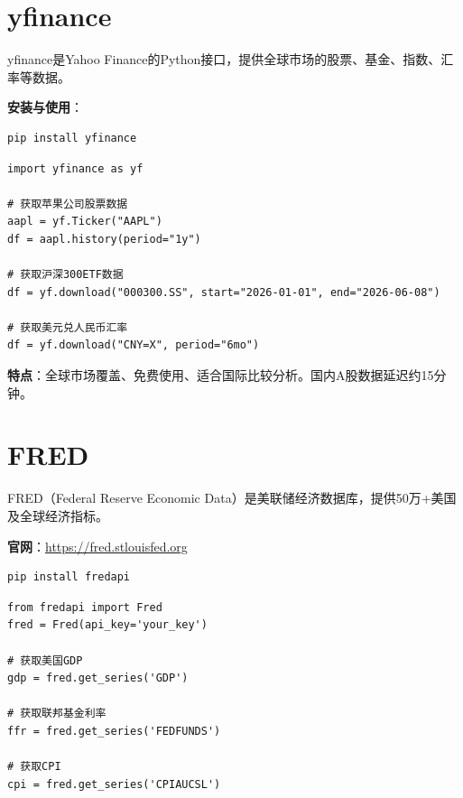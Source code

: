 \section{yfinance}

yfinance是Yahoo Finance的Python接口，提供全球市场的股票、基金、指数、汇率等数据。

\textbf{安装与使用}：

\begin{lstlisting}[style=shell]
pip install yfinance
\end{lstlisting}

\begin{lstlisting}[style=python]
import yfinance as yf

# 获取苹果公司股票数据
aapl = yf.Ticker("AAPL")
df = aapl.history(period="1y")

# 获取沪深300ETF数据
df = yf.download("000300.SS", start="2026-01-01", end="2026-06-08")

# 获取美元兑人民币汇率
df = yf.download("CNY=X", period="6mo")
\end{lstlisting}

\textbf{特点}：全球市场覆盖、免费使用、适合国际比较分析。国内A股数据延迟约15分钟。

\section{FRED}

FRED（Federal Reserve Economic Data）是美联储经济数据库，提供50万+美国及全球经济指标。

\textbf{官网}：\url{https://fred.stlouisfed.org}

\begin{lstlisting}[style=shell]
pip install fredapi
\end{lstlisting}

\begin{lstlisting}[style=python]
from fredapi import Fred
fred = Fred(api_key='your_key')

# 获取美国GDP
gdp = fred.get_series('GDP')

# 获取联邦基金利率
ffr = fred.get_series('FEDFUNDS')

# 获取CPI
cpi = fred.get_series('CPIAUCSL')
\end{lstlisting}

